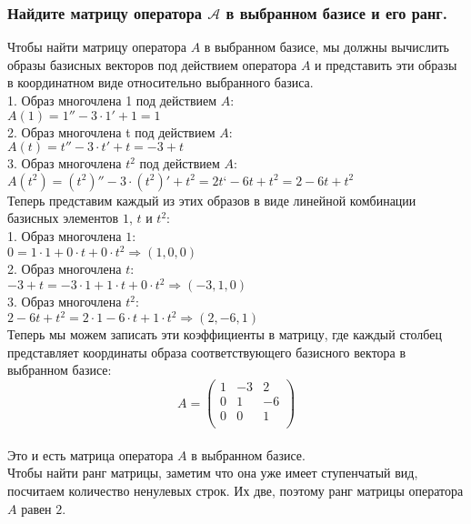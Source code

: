 \documentclass{article}
\begin{document}
    \subsubsection{Найдите матрицу оператора $\mathcal{A}$ в выбранном базисе и его ранг.}
    Чтобы найти матрицу оператора $A$ в выбранном базисе, мы должны
    вычислить образы базисных векторов под действием оператора $A$ и
    представить эти образы в координатном виде относительно выбранного
    базиса. \\
    1. Образ многочлена 1 под действием $A$:\\
    $A(1) = 1'' - 3  \cdot  1' + 1 = 1$\\
    2. Образ многочлена t под действием $A$:\\
    $A(t) = t'' - 3  \cdot  t' + t = -3 + t$\\
    3. Образ многочлена $t^2$ под действием $A$:\\
    $A(t^2) = (t^2)'' - 3  \cdot  (t^2)' + t^2 = 2t‘ - 6t + t^2 = 2 - 6t + t^2$\\
    Теперь представим каждый из этих образов в виде линейной
    комбинации базисных элементов $1$, $t$ и $t^2$:\\
    1. Образ многочлена $1$:\\
    $0 = 1  \cdot  1 + 0  \cdot  t + 0  \cdot  t^2 \Rightarrow (1, 0, 0)$\\
    2. Образ многочлена $t$:\\
    $-3 + t = -3  \cdot  1 + 1  \cdot  t + 0  \cdot  t^2 \Rightarrow (-3, 1, 0)$\\
    3. Образ многочлена $t^2$:\\
    $2 - 6t + t^2 = 2  \cdot  1 - 6  \cdot  t + 1  \cdot  t^2 \Rightarrow (2, -6, 1)$\\
    Теперь мы можем записать эти коэффициенты в матрицу, где каждый
    столбец представляет координаты образа соответствующего базисного
    вектора в выбранном базисе:
    \\
    \begin{equation*}
        A =
        \begin{pmatrix}
            1& -3& 2\\
            0& 1& -6\\
            0& 0& 1\\
        \end{pmatrix}
    \end{equation*}
    \\
    Это и есть матрица оператора $A$ в выбранном базисе. \\
    Чтобы найти ранг матрицы, заметим что она уже имеет ступенчатый вид,
    посчитаем количество ненулевых строк. Их две, поэтому ранг матрицы
    оператора $A$ равен $2$. \\
    
\end{document}

